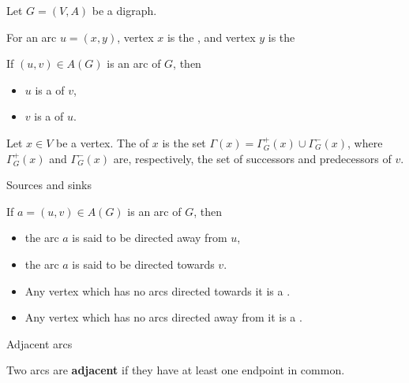 \documentclass[aspectratio=169]{beamer}
\begin{document}
\begin{frame}
	Let $G=(V,A)$ be a digraph.
	\begin{definition}
	For an arc $u=(x,y)$, vertex $x$ is the , and vertex $y$ is the 
	\end{definition}
	\begin{definition}
		If $(u,v)\in A(G)$ is an arc of $G$, then
		\begin{itemize}
			\item  $u$ is a  of $v$,
			\item  $v$ is a  of $u$.
		\end{itemize}
	\end{definition}
	\begin{definition}
	Let $x\in V$ be a vertex. The  of $x$ is the set $\Gamma(x) = \Gamma^+_G(x)\cup\Gamma^-_G(x)$, where $\Gamma^+_G(x)$ and $\Gamma^-_G(x)$ are, respectively, the set of successors and predecessors of $v$.
	\end{definition}
\end{frame}
	
	
\begin{frame}{Sources and sinks}
	\begin{definition}
		If $a=(u,v)\in A(G)$ is an arc of $G$, then
		\begin{itemize}
			\item the arc $a$ is said to be directed away from $u$,
			\item the arc $a$ is said to be directed towards $v$.
		\end{itemize}
	\end{definition}
	
	\begin{definition}
		\begin{itemize}
			\item Any vertex which has no arcs directed towards it is a .
			\item Any vertex which has no arcs directed away from it is a .
		\end{itemize}
	\end{definition}
\end{frame}

\begin{frame}{Adjacent arcs}
	\begin{definition}
		Two arcs are \textbf{adjacent} if they have at least one endpoint in common.
	\end{definition}
\end{frame}
\end{document}
